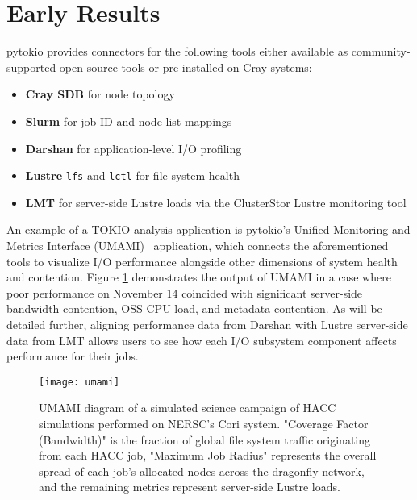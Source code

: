 \section{Early Results}

pytokio provides connectors for the following tools either available as community-supported open-source tools or pre-installed on Cray systems:

\begin{itemize}
\item \textbf{Cray SDB} for node topology
\item \textbf{Slurm} for job ID and node list mappings
\item \textbf{Darshan} for application-level I/O profiling
\item \textbf{Lustre} \texttt{lfs} and \texttt{lctl} for file system health
\item \textbf{LMT} for server-side Lustre loads via the ClusterStor Lustre monitoring tool~\cite{Keopp2014}
\end{itemize}

An example of a TOKIO analysis application is pytokio's Unified Monitoring and Metrics Interface (UMAMI)~\cite{Lockwood2017} application, which connects the aforementioned tools to visualize I/O performance alongside other dimensions of system health and contention.  Figure \ref{fig:umami} demonstrates the output of UMAMI in a case where poor performance on November 14 coincided with significant server-side bandwidth contention, OSS CPU load, and metadata contention.  As will be detailed further, aligning performance data from Darshan with Lustre server-side data from LMT allows users to see how each I/O subsystem component affects performance for their jobs.
% 
% 

\begin{figure}[t]
    \centering
    \texttt{[image: umami]}
    \vspace{-.3in}
    \caption{UMAMI diagram of a simulated science campaign of HACC~\cite{Habib2012} simulations performed on NERSC's Cori system.  "Coverage Factor (Bandwidth)" is the fraction of global file system traffic originating from each HACC job, "Maximum Job Radius" represents the overall spread of each job's allocated nodes across the dragonfly network, and the remaining metrics represent server-side Lustre loads.}
    \label{fig:umami}
    \vspace{-.2in}
\end{figure}

